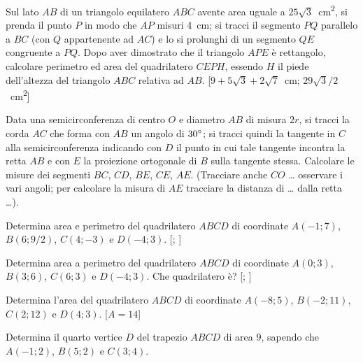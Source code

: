 \begin{multicols}{2}
\begin{esercizio}
\label{ese:7.90}
Sul lato $AB$ di un triangolo equilatero $ABC$ avente area uguale a $25\sqrt{3}$~cm\textsuperscript{2}, si prenda il punto $P$ in modo che $AP$ misuri 4~cm; si tracci il segmento $PQ$ parallelo a $BC$ (con $Q$ appartenente ad $AC$) e lo si prolunghi di un segmento $QE$ congruente a $PQ$. Dopo aver dimostrato che il triangolo $APE$ è rettangolo, calcolare perimetro ed area del quadrilatero $CEPH$, essendo $H$ il piede dell'altezza del triangolo $ABC$ relativa ad $AB$.
[$9 + 5\sqrt{3} + 2\sqrt{7}$~cm; $29\sqrt{3}/2$~cm\textsuperscript{2}]
\end{esercizio}

\begin{esercizio}
\label{ese:7.91}
Data una semicirconferenza di centro $O$ e diametro $AB$ di misura $2r$, si tracci la corda $AC$ che forma con $AB$ un angolo di $30{}^{\circ}$; si tracci quindi la tangente in $C$ alla semicirconferenza indicando con $D$ il punto in cui tale tangente incontra la retta $AB$ e con $E$ la proiezione ortogonale di $B$ sulla tangente stessa. Calcolare le misure dei segmenti $BC$, $CD$, $BE$, $CE$, $AE$. (Tracciare anche $CO$ \ldots{} osservare i vari angoli; per calcolare la misura di $AE$ tracciare la distanza di \ldots{} dalla retta \ldots{}).
\end{esercizio}

\begin{esercizio}
\label{ese:7.92}
Determina area e perimetro del quadrilatero $ABCD$ di coordinate $A(-1;7)$, $B(6;9/2)$, $C(4;-3)$ e $D(-4;3)$.
[; ]
\end{esercizio}

\begin{esercizio}
\label{ese:7.93}
Determina area a perimetro del quadrilatero $ABCD$ di coordinate $A(0;3)$, $B(3;6)$, $C(6;3)$ e $D(-4;3)$. Che quadrilatero è? [; ]
\end{esercizio}

\begin{esercizio}
\label{ese:7.94}
Determina l'area del quadrilatero $ABCD$ di coordinate $A(-8;5)$, $B(-2;11)$, $C(2;12)$ e $D(4;3)$.
[$A=14$]
\end{esercizio}

\begin{esercizio}
\label{ese:7.95}
Determina il quarto vertice $D$ del trapezio $ABCD$ di area $9$, sapendo che $A(-1;2)$, $B(5;2)$ e $C(3;4)$.
\end{esercizio}


\end{multicols}
